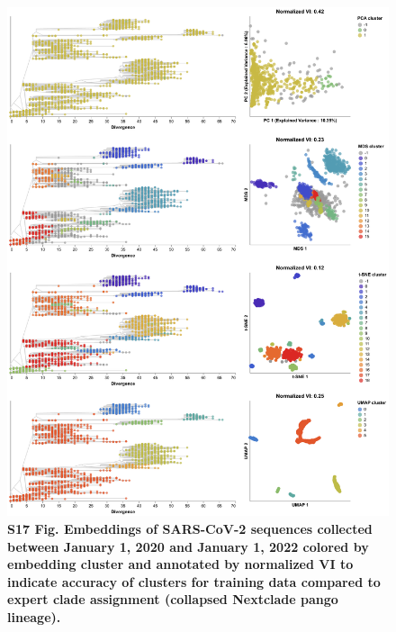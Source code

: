 \documentclass[10pt,letterpaper]{article}
\begin{document}
\begin{figure}[!h]
\includegraphics[width=\columnwidth]{figures/sarscov2-embeddings-by-cluster-vs-Nextclade_pango_collapsed.png}
\caption*{{\bf S17 Fig. Embeddings of SARS-CoV-2 sequences collected between January 1, 2020 and January 1, 2022 colored by embedding cluster and annotated by normalized VI to indicate accuracy of clusters for training data compared to expert clade assignment (collapsed Nextclade pango lineage).}}
\end{figure}
\end{document}
